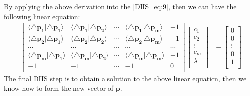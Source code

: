 By applying the above derivation into the \ref{DIIS_eq:9}, then we can have the following 
linear equation:
\begin{align}
 \label{DIIS_eq:10}
 &\begin{bmatrix}
  \langle\triangle \mathbf{p_{1}}|\triangle\mathbf{p_{1}}\rangle  &
  \langle\triangle \mathbf{p_{1}}|\triangle\mathbf{p_{2}}\rangle  &
  \cdots                                                          &
  \langle\triangle \mathbf{p_{1}}|\triangle\mathbf{p_{m}}\rangle  &
   -1                                                             \\
  \langle\triangle \mathbf{p_{2}}|\triangle\mathbf{p_{1}}\rangle  &
  \langle\triangle \mathbf{p_{2}}|\triangle\mathbf{p_{2}}\rangle  &
  \cdots                                                          &
  \langle\triangle \mathbf{p_{2}}|\triangle\mathbf{p_{m}}\rangle  &
   -1                                                             \\
  \cdots                                                          &
  \cdots                                                          &
  \cdots                                                          &
  \cdots                                                          &
  \cdots                                                          \\
  \langle\triangle \mathbf{p_{m}}|\triangle\mathbf{p_{1}}\rangle  &
  \langle\triangle \mathbf{p_{m}}|\triangle\mathbf{p_{2}}\rangle  &
  \cdots                                                          &
  \langle\triangle \mathbf{p_{m}}|\triangle\mathbf{p_{m}}\rangle  &
  -1                                                             \\  
  -1                                                              &
  -1                                                              &
  \cdots                                                          &
  -1                                                              &
   0                                                             \\
 \end{bmatrix}
 \begin{bmatrix}
  c_{1}  \\
  c_{2}  \\
  \vdots \\
  c_{m}  \\
  \lambda\\ 
 \end{bmatrix}
&=  \begin{bmatrix}
   0  \\
   0  \\
  \vdots \\
   0  \\
   1  \\ 
 \end{bmatrix}
\end{align}
The final DIIS step is to obtain a solution to the above linear equation, then 
we know how to form the new vector of $\mathbf{p}$.

